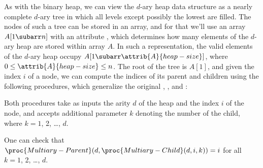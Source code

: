 As with the binary heap, we can view the $d$-ary heap data structure as a nearly complete $d$-ary tree in which all levels except possibly the lowest are filled.
The nodes of such a tree can be stored in an array, and for that we'll use an array $A[1\subarr n]$ with an attribute , which determines how many elements of the $d$-ary heap are stored within array $A$.
In such a representation, the valid elements of the $d$-ary heap occupy $A[1\subarr\attrib{A}{heap-size}]$, where $0\le\attrib{A}{heap-size}\le n$.
The root of the tree is $A[1]$, and given the index $i$ of a node, we can compute the indices of its parent and children using the following procedures, which generalize the original , , and :


Both procedures take as inputs the arity $d$ of the heap and the index $i$ of the node, and  accepts additional parameter $k$ denoting the number of the child, where $k=1$, 2, \dots, $d$.

One can check that $\proc{Multiary-Parent}(d,\proc{Multiary-Child}(d,i,k))=i$ for all $k=1$, 2, \dots, $d$.
